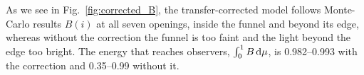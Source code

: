 



As we see in Fig.~\ref{fig:corrected_B},  the transfer-corrected model follows Monte-Carlo results $B(i)$ at all seven openings, inside the funnel and beyond its edge, whereas without the correction the funnel is too faint and the light beyond the edge too bright.
The energy that reaches observers, $\int_0^1 B\,{\rm d}\mu$, is 0.982--0.993 with the correction and 0.35--0.99 without it.

